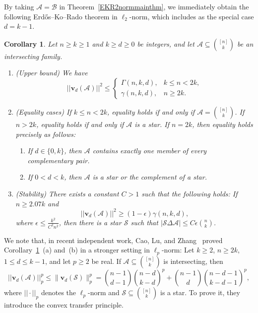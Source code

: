 \documentclass[10pt,a4paper]{amsart}
\numberwithin{equation}{section}
\newtheorem{corollary}[theorem]{Corollary}
\newtheorem{remark}[theorem]{Remark}
\def\A{\mathcal{A}}
\def\B{\mathcal{B}}
\def\S{\mathcal{S}}
\begin{document}
By taking $\A=\B$ in Theorem~\ref{EKR2normmainthm}, we immediately obtain the following
Erd\H{o}s--Ko--Rado theorem in $\ell_2$-norm, which includes
\cite[Theorem 1.3]{Brooks} as the special case $d=k-1$.

\begin{corollary}\label{EKR2normmainthm000}
Let $n \geq k\geq1$ and $k\geq d \geq 0$ be integers, and let
$\A \subseteq \binom{[n]}{k}$ be an intersecting family.
\begin{enumerate}[label={\rm (\alph*)}]
\item {\rm(Upper bound)} We have
\[
||\mathbf{v}_{d}(\A)||^2
\leq
\begin{cases}
\Gamma(n,k,d),& k\leq n<2k,\\
\gamma(n,k,d),& n\geq 2k.
\end{cases}
\]

\item {\rm(Equality cases)}
If $k\leq n<2k$, equality holds if and only if
$\A=\binom{[n]}k$.
If $n>2k$, equality holds if and only if $\A$ is a star.
If $n=2k$, then equality holds precisely as follows:
\begin{enumerate}[label={\rm (\roman*)}]
\item If $d\in\{0,k\}$, then $\A$ contains exactly one member of every complementary pair.

\item If $0<d<k$, then $\A$ is a star or the complement of a star.
\end{enumerate}

\item {\rm(Stability)} There exists a constant $C>1$ such that the following holds: If $n\geq 2.07k$ and
\[
||\mathbf{v}_{d}(\A)||^2 \geq (1-\epsilon)\gamma(n,k,d),
\]
where $\epsilon\leq \frac{k^2}{C^2 n ^2 }$, then there is a star
$\mathcal{S}$ such that
$|\mathcal{S} \Delta \A|\leq C \epsilon \binom{n}{k}$.
\end{enumerate}
\end{corollary}



We note that, in recent independent work,  Cao, Lu, and Zhang~\cite[Theorem 1.5]{Cao} proved Corollary~\ref{EKR2normmainthm000}~(a) and~(b) in a stronger setting in $\ell_p$-norm:
Let $k\geq2$, $n\geq2k$, $1\leq d\leq k-1$, and let $p\geq2$ be real.
If
$\A\subseteq\binom{[n]}{k}$ is intersecting, then
\begin{equation}\label{eq:all-level-main}
||\mathbf{v}_{d}(\A)||_p^p
\leq \|\mathbf{v}_{d}(\S)\|_p^p
=
\binom{n-1}{d-1}\binom{n-d}{k-d}^{\!p}
+
\binom{n-1}{d}\binom{n-d-1}{k-d-1}^{\!p},
\end{equation}
where $||\cdot||_p$ denotes the $\ell_p$-norm and $\S\subseteq \binom{[n]}{k}$ is a star.
To prove it, they introduce the convex transfer principle.
\end{document}
